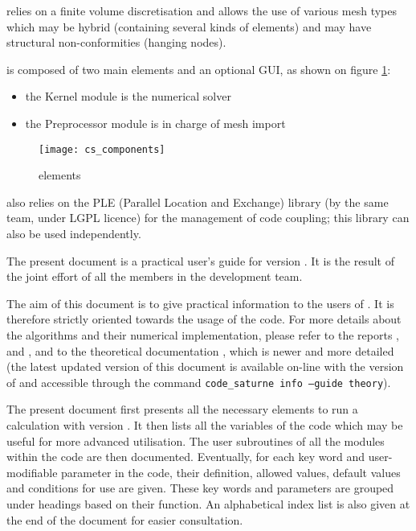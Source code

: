 \CS relies on a finite volume discretisation and allows the use of
various mesh types which may be hybrid (containing several kinds of
elements) and may have structural non-conformities (hanging nodes).


\CS is composed of two main elements and an optional GUI,
as shown on figure \ref{Fig_elements}:
\begin{itemize}
\item the Kernel module is the numerical solver
\item the Preprocessor module is in charge of mesh import\\
\end{itemize}

\begin{figure}[!h]
\centerline{
\texttt{[image: cs\_components]}}
\caption{\CS elements}\label{Fig_elements}
\end{figure}

\indent\CS also relies on the PLE (Parallel Location and Exchange) library (by
the same team, under LGPL licence) for the management of code coupling;
this library can also be used independently.

The present document is a practical user's guide for \CS version \verscs.
It is the result of the joint effort of
all the members in the development team.

The aim of this document is to give practical information to the users of
\CS. It is therefore strictly oriented towards the usage of the code.
For more details about the algorithms and their numerical
implementation, please refer to the reports \cite{ijvf},
 \cite{boucker00} and \cite{mechitoua98}, and to the theoretical documentation \cite{theory},
which is newer and more detailed
(the latest updated version of this document
is available on-line with the version of \CS and accessible through the command
\texttt{code\_saturne info --guide theory}).

The present document first
presents all the necessary elements to run a calculation
with \CS version \verscs. It then lists all the variables of the code
which may be useful for more advanced utilisation.
The user subroutines of all the modules within the code are then documented.
Eventually, for each key word and user-modifiable parameter in the code,
their definition, allowed values, default values and conditions for use are given.
These key words and parameters are grouped under headings
based on their function. An alphabetical index list is also given at the end of
the document for easier consultation.

